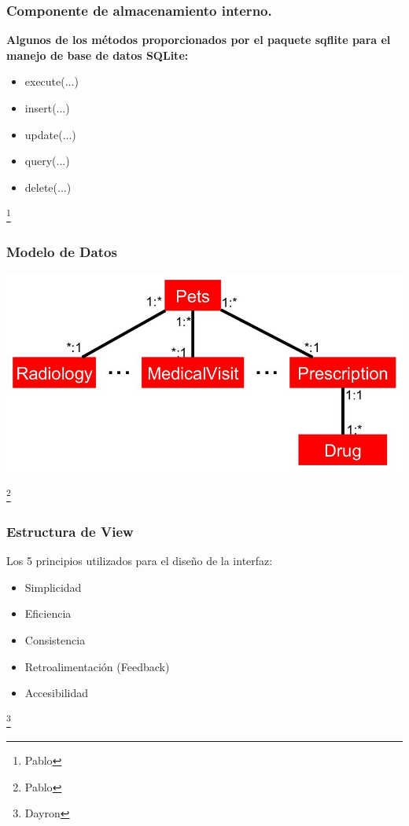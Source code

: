 \documentclass[14pt]{beamer}
\begin{document}
\begin{frame}
\frametitle{Componente de almacenamiento interno.}

\textbf{Algunos de los métodos proporcionados por el paquete sqflite para el manejo de base de datos SQLite:}

\begin{itemize}


\item execute(...)
\item insert(...)
\item update(...)
\item query(...)
\item delete(...)
\end{itemize}
\footnote{Pablo}
\end{frame}



\begin{frame}
\frametitle{Modelo de Datos}

\begin{center}

\includegraphics[scale =0.35]{Images/symplifiedClass.jpg}

\end{center}

\footnote{Pablo}
\end{frame}


\begin{frame}
\frametitle{Estructura de View}
Los 5 principios utilizados para el diseño de la interfaz:
\begin{itemize}
\item Simplicidad
\item Eficiencia
\item Consistencia
\item Retroalimentación (Feedback)
\item Accesibilidad
\end{itemize}
\footnote{Dayron}
\end{frame}
\end{document}
